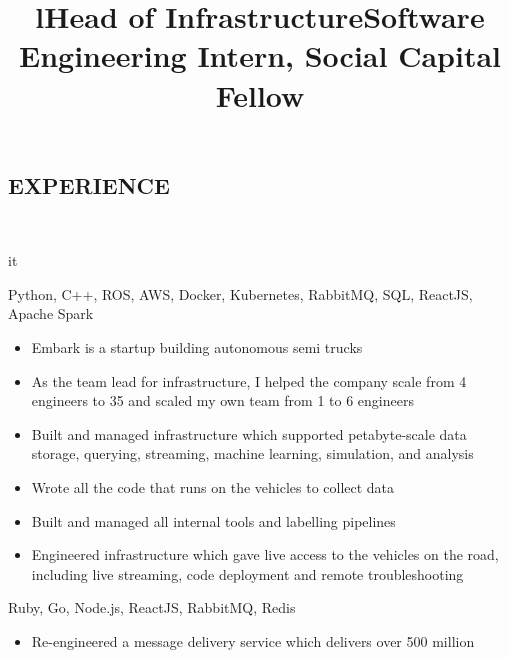 \documentclass[]{res}
\begin{document}
\begin{resume}
\section{EXPERIENCE}
  \begin{format}  \\ \title{l}{it} \\ \body \end{format}
  \title{Head of Infrastructure}
  \begin{position}
    \begin{description}
      \item Python, C++, ROS, AWS, Docker, Kubernetes, RabbitMQ, SQL, ReactJS, Apache Spark
    \end{description}
    \begin{itemize}
      \item Embark is a startup building autonomous semi trucks
      \item As the team lead for infrastructure, I helped the company scale from 4 engineers
        to 35 and scaled my own team from 1 to 6 engineers
      \item Built and managed infrastructure which supported petabyte-scale data storage, querying, streaming, machine learning, simulation, and analysis
      \item Wrote all the code that runs on the vehicles to collect data
      \item Built and managed all internal tools and labelling pipelines
      \item Engineered infrastructure which gave live access to the vehicles on the road, including
        live streaming, code deployment and remote troubleshooting
    \end{itemize}
  \end{position}
  \title{Software Engineering Intern, Social Capital Fellow}
  \begin{position}
    \begin{description}
      \item Ruby, Go, Node.js, ReactJS, RabbitMQ, Redis
    \end{description}
    \begin{itemize}
      \item Re-engineered a message delivery service which delivers over 500 million

\end{itemize}
\end{position}
\end{resume}
\end{document}
